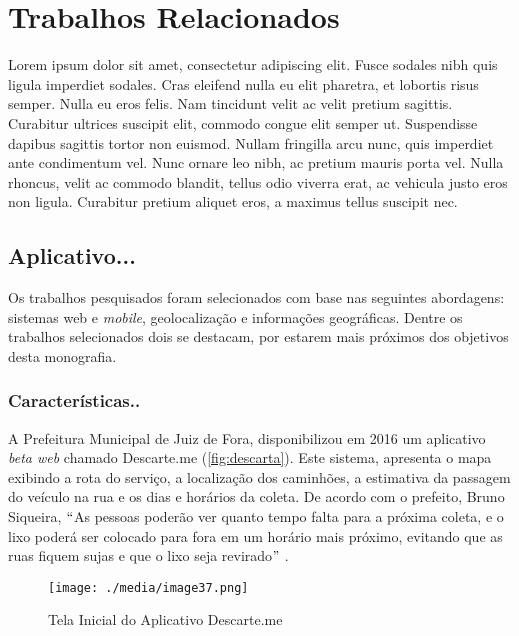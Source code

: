 \chapter{Trabalhos Relacionados}
\label{cap:trabalhos}
Lorem ipsum dolor sit amet, consectetur adipiscing elit. Fusce sodales nibh quis ligula imperdiet sodales. Cras eleifend nulla eu elit pharetra, et lobortis risus semper. Nulla eu eros felis. Nam tincidunt velit ac velit pretium sagittis. Curabitur ultrices suscipit elit, commodo congue elit semper ut. Suspendisse dapibus sagittis tortor non euismod. Nullam fringilla arcu nunc, quis imperdiet ante condimentum vel. Nunc ornare leo nibh, ac pretium mauris porta vel. Nulla rhoncus, velit ac commodo blandit, tellus odio viverra erat, ac vehicula justo eros non ligula. Curabitur pretium aliquet eros, a maximus tellus suscipit nec. 

\section{Aplicativo...}

Os trabalhos pesquisados foram selecionados com base nas seguintes abordagens: sistemas web e \textit{mobile}, geolocalização e informações geográficas. Dentre os trabalhos selecionados dois se destacam, por estarem mais próximos dos objetivos desta monografia.

\subsection{Características..}

A Prefeitura Municipal de Juiz de Fora, disponibilizou em 2016 um aplicativo \textit{beta web} chamado Descarte.me (\autoref{fig:descarta}). Este sistema, apresenta o mapa exibindo a rota do serviço, a localização dos caminhões, a estimativa da passagem do veículo na rua e os dias e horários da coleta. De acordo com o prefeito, Bruno Siqueira, $``$As pessoas poderão ver quanto tempo falta para a próxima coleta, e o lixo poderá ser colocado para fora em um horário mais próximo, evitando que as ruas fiquem sujas e que o lixo seja revirado$"$  \cite{tribuna}.


\begin{figure}[H]
	\begin{Center}
		\texttt{[image: ./media/image37.png]}
	\end{Center}
	\caption{Tela Inicial do Aplicativo Descarte.me}
	\label{fig:descarta}
\end{figure}

